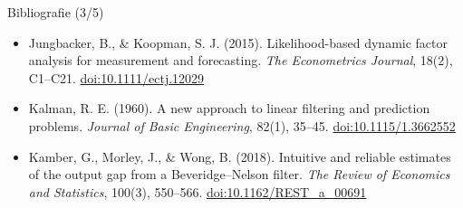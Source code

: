 \begin{frame}{Bibliografie (3/5)}
\begin{itemize}
    \item Jungbacker, B., \& Koopman, S. J. (2015). Likelihood-based dynamic factor analysis for measurement and forecasting. \textit{The Econometrics Journal}, 18(2), C1--C21. \href{https://doi.org/10.1111/ectj.12029}{doi:10.1111/ectj.12029}
    \item Kalman, R. E. (1960). A new approach to linear filtering and prediction problems. \textit{Journal of Basic Engineering}, 82(1), 35--45. \href{https://doi.org/10.1115/1.3662552}{doi:10.1115/1.3662552}
    \item Kamber, G., Morley, J., \& Wong, B. (2018). Intuitive and reliable estimates of the output gap from a Beveridge--Nelson filter. \textit{The Review of Economics and Statistics}, 100(3), 550--566. \href{https://doi.org/10.1162/REST_a_00691}{doi:10.1162/REST\_a\_00691}
\end{itemize}
\end{frame}

